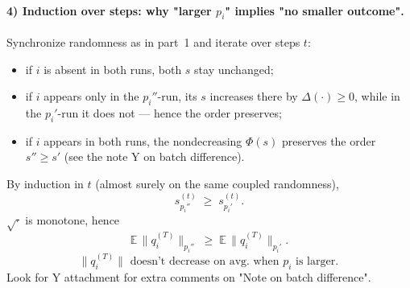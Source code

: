 \paragraph{4) Induction over steps: why "larger $p_i$" implies "no smaller outcome".}
Synchronize randomness as in part~1 and iterate over steps $t$:
\begin{itemize}
  \item if $i$ is absent in both runs, both $s$ stay unchanged;
  \item if $i$ appears only in the $p_i''$-run, its $s$ increases there by $\Delta(\cdot) \ge 0$, while in the $p_i'$-run it does not — hence the order preserves;
  \item if $i$ appears in both runs, the nondecreasing $\Phi(s)$ preserves the order $s'' \ge s'$ (see the note Y on batch difference).
\end{itemize}
By induction in $t$ (almost surely on the same coupled randomness),
\begin{equation}
s^{(t)}_{p_i''} \;\ge\; s^{(t)}_{p_i'}.
\end{equation}
$\sqrt{\cdot}$ is monotone, hence
\begin{equation}
\mathbb E\,\bigl\|q_i^{(T)}\bigr\|_{p_i''} \;\ge\; \mathbb E\,\bigl\|q_i^{(T)}\bigr\|_{p_i'}.
\end{equation}
\begin{equation}
\boxed{\bigl\|q_i^{(T)}\bigr\| \text{ doesn't decrease on avg. when } p_i \text{ is larger.} \, }
\end{equation}
Look for Y attachment for extra comments on "Note on batch difference".
